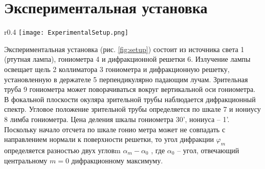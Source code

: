 \section{Экспериментальная установка}

\begin{wrapfigure}[18]{r}{0.4\textwidth}
	\centering
	\texttt{[image: ExperimentalSetup.png]}
	\caption{Схема установки}
	\label{fig:setup}
\end{wrapfigure}

Экспериментальная установка (рис. \ref{fig:setup}) состоит из источника света 1 (ртутная лампа), гониометра 4 и дифракционной решетки 6. Излучение лампы освещает щель 2 коллиматора 3 гониометра и дифракционную решетку, установленную в держателе 5 перпендикулярно падающим лучам. Зрительная труба 9 гониометра может поворачиваться вокруг вертикальной оси гониометра. В фокальной плоскости окуляра зрительной трубы наблюдается дифракционный спектр. Угловое положение зрительной трубы определяется по шкале 7 и нониусу 8 лимба гониометра. Цена деления шкалы гониометра 30', нониуса – 1'. Поскольку начало отсчета по шкале гонио метра может не совпадать с направлением нормали к поверхности решетки, то угол дифракции $\varphi_m$ определяется разностью двух угловm $\alpha_m - \alpha_0$ , где $\alpha_0$ – угол, отвечающий центральному $m = 0$ дифракционному максимуму.

